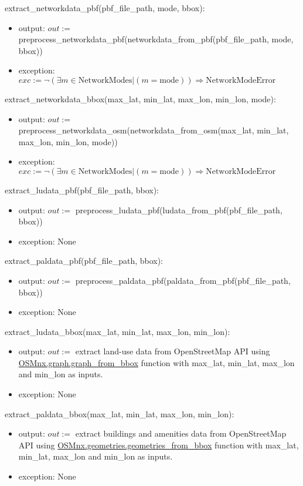 \documentclass[12pt, titlepage]{article}
\begin{document}
extract\_networkdata\_pbf(pbf\_file\_path, mode, bbox):
\begin{itemize}
\item output: 
$out := $ preprocess\_networkdata\_pbf(networkdata\_from\_pbf(pbf\_file\_path, mode, bbox))
\item exception: $exc := \neg(\exists m \in \text{NetworkModes} | (m = \text{mode})) 
  \Rightarrow \text{NetworkModeError}$
\end{itemize}

extract\_networkdata\_bbox(max\_lat, min\_lat, max\_lon, min\_lon, mode): 
\begin{itemize}
\item output: 
$out := $ preprocess\_networkdata\_osm(networkdata\_from\_osm(max\_lat, min\_lat, max\_lon, min\_lon, mode))
\item exception: 
$exc := \neg(\exists m \in \text{NetworkModes} | (m = \text{mode})) 
  \Rightarrow \text{NetworkModeError}$
\end{itemize}

extract\_ludata\_pbf(pbf\_file\_path, bbox):
\begin{itemize}
\item output: 
$out := $ preprocess\_ludata\_pbf(ludata\_from\_pbf(pbf\_file\_path, bbox))
\item exception: None
\end{itemize}

extract\_paldata\_pbf(pbf\_file\_path, bbox):
\begin{itemize}
\item output: 
$out := $ preprocess\_paldata\_pbf(paldata\_from\_pbf(pbf\_file\_path, bbox))
\item exception: None
\end{itemize}

extract\_ludata\_bbox(max\_lat, min\_lat, max\_lon, min\_lon):
\begin{itemize}
\item output: 
$out := $ extract land-use data from OpenStreetMap API using \newline \href{https://osmnx.readthedocs.io/en/stable/osmnx.html#osmnx.graph.graph_from_bbox}{OSMnx.graph.graph\_from\_bbox} function with max\_lat, min\_lat, max\_lon and min\_lon as inputs. 
\item exception: None
\end{itemize}

extract\_paldata\_bbox(max\_lat, min\_lat, max\_lon, min\_lon):
\begin{itemize}
\item output: 
$out := $ extract buildings and amenities data from OpenStreetMap API using \newline \href{https://osmnx.readthedocs.io/en/stable/osmnx.html#osmnx.geometries.geometries_from_bbox}{OSMnx.geometries.geometries\_from\_bbox} function with max\_lat, min\_lat, max\_lon and min\_lon as inputs.
\item exception: None
\end{itemize}
\end{document}
